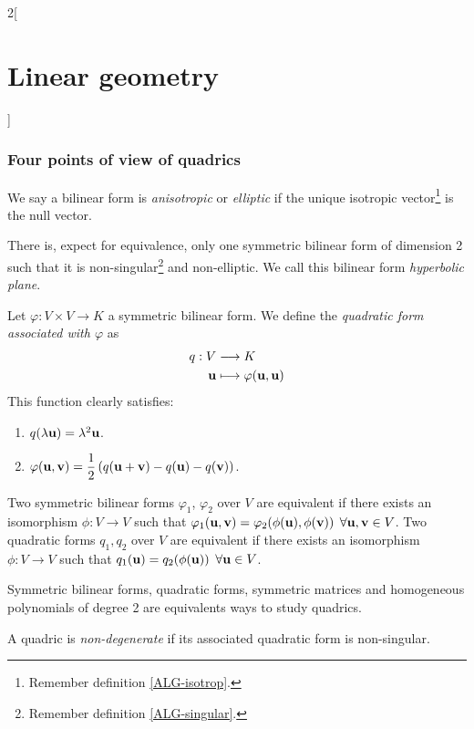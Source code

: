 \documentclass[../../../main.tex]{subfiles}
\begin{document}
\begin{multicols}{2}[\section{Linear geometry}]
    \subsubsection*{Four points of view of quadrics}
    \begin{definition}
        We say a bilinear form is \textit{anisotropic} or \textit{elliptic} if the unique isotropic vector\footnote{Remember definition \ref{ALG-isotrop}.} is the null vector.
    \end{definition}
    \begin{theorem}
        There is, expect for equivalence, only one symmetric bilinear form of dimension 2 such that it is non-singular\footnote{Remember definition \ref{ALG-singular}.} and non-elliptic. We call this bilinear form \textit{hyperbolic plane}.
    \end{theorem}
    \begin{definition}
        Let $\varphi:V\times V\rightarrow K$ a symmetric bilinear form. We define the \textit{quadratic form associated with $\varphi$} as
        \begin{align*}
            q:V           & \longrightarrow K                               \\
            \vb{u} & \longmapsto\varphi(\vb{u},\vb{u})
        \end{align*} This function clearly satisfies:
        \begin{enumerate}
            \item $q(\lambda\vb{u})=\lambda^2\vb{u}$.
            \item $\displaystyle\varphi(\vb{u},\vb{v})=\frac{1}{2}\left(q(\vb{u}+\vb{v})-q(\vb{u})-q(\vb{v})\right)$.
        \end{enumerate}
    \end{definition}
    \begin{prop}
        Two symmetric bilinear forms $\varphi_1$, $\varphi_2$ over $V$ are equivalent if there exists an isomorphism $\phi:V\rightarrow V$ such that $\varphi_1(\vb{u},\vb{v})=\varphi_2(\phi(\vb{u}),\phi(\vb{v}))$ $\forall\vb{u},\vb{v}\in V$.\newline
        Two quadratic forms $q_1,q_2$ over $V$ are equivalent if there exists an isomorphism $\phi:V\rightarrow V$ such that $q_1(\vb{u})=q_2(\phi(\vb{u}))$ $\forall\vb{u}\in V$.
    \end{prop}
    \begin{theorem}
        Symmetric bilinear forms, quadratic forms, symmetric matrices and homogeneous polynomials of degree 2 are equivalents ways to study quadrics.
    \end{theorem}
    \begin{definition}
        A quadric is \textit{non-degenerate} if its associated quadratic form is non-singular.
    \end{definition}

\end{multicols}
\end{document}
